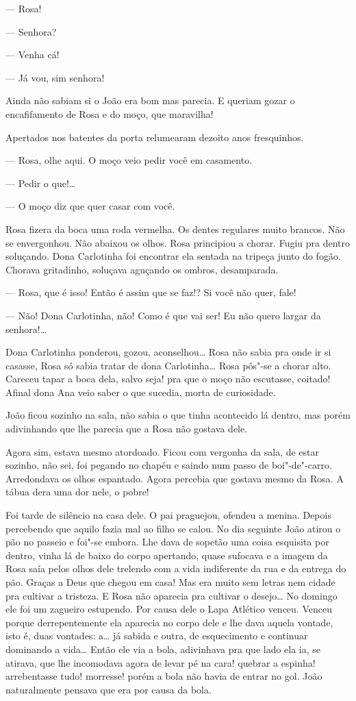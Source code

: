 \begin{linenumbers}
--- Rosa!

--- Senhora?

--- Venha cá!

--- Já vou, sim senhora!

Ainda não sabiam si o João era bom mas parecia. E queriam gozar o
encafifamento de Rosa e do moço, que maravilha!

Apertados nos batentes da porta relumearam dezoito anos fresquinhos.

--- Rosa, olhe aqui. O moço veio pedir você em casamento.

--- Pedir o que!\ldots{}

--- O moço diz que quer casar com você.

Rosa fizera da boca uma roda vermelha. Os dentes regulares muito
brancos. Não se envergonhou. Não abaixou os olhos. Rosa principiou a
chorar. Fugiu pra dentro soluçando. Dona Carlotinha foi encontrar ela
sentada na tripeça junto do fogão. Chorava gritadinho, soluçava aguçando
os ombros, desamparada.

--- Rosa, que é isso! Então é assim que se faz!? Si você não quer, fale!

--- Não! Dona Carlotinha, não! Como é que vai ser! Eu não quero largar
da senhora!\ldots{} 

Dona Carlotinha ponderou, gozou, aconselhou\ldots{} Rosa não sabia pra onde
ir si casasse, Rosa só sabia tratar de dona Carlotinha\ldots{} Rosa pôs"-se a
chorar alto. Careceu tapar a boca dela, salvo seja! pra que o moço não
escutasse, coitado! Afinal dona Ana veio saber o que sucedia, morta de
curiosidade.

João ficou sozinho na sala, não sabia o que tinha acontecido lá dentro,
mas porém adivinhando que lhe parecia que a Rosa não gostava dele.

Agora sim, estava mesmo atordoado. Ficou com vergonha da sala, de estar
sozinho, não sei, foi pegando no chapéu e saindo num passo de
boi"-de"-carro. Arredondava os olhos espantado. Agora percebia que gostava
mesmo da Rosa. A tábua dera uma dor nele, o pobre!

Foi tarde de silêncio na casa dele. O pai praguejou, ofendeu a menina.
Depois percebendo que aquilo fazia mal ao filho se calou. No dia
seguinte João atirou o pão no passeio e foi"-se embora. Lhe dava de
sopetão uma coisa esquisita por dentro, vinha lá de baixo do corpo
apertando, quase sufocava e a imagem da Rosa saía pelos olhos dele
trelendo com a vida indiferente da rua e da entrega do pão. Graças a
Deus que chegou em casa! Mas era muito sem letras nem cidade pra
cultivar a tristeza. E Rosa não aparecia pra cultivar o desejo\ldots{} No
domingo ele foi um zagueiro estupendo. Por causa dele o Lapa Atlético
venceu. Venceu porque derrepentemente ela aparecia no corpo dele e lhe
dava aquela vontade, isto é, duas vontades: a\ldots{} já sabida e outra, de
esquecimento e continuar dominando a vida\ldots{} Então ele via a bola,
adivinhava pra que lado ela ia, se atirava, que lhe incomodava agora de
levar pé na cara! quebrar a espinha! arrebentasse tudo! morresse! porém
a bola não havia de entrar no gol. João naturalmente pensava que era por
causa da bola.


\end{linenumbers}

